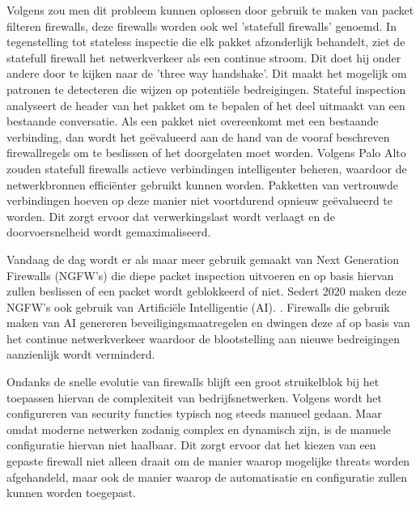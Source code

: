 Volgens \textcite{paloAltoSF2025} zou men dit probleem kunnen oplossen door gebruik te maken van packet filteren firewalls, deze firewalls worden ook wel 'statefull firewalls' genoemd. In tegenstelling tot stateless inspectie die elk pakket afzonderlijk behandelt, ziet de statefull firewall het netwerkverkeer als een continue stroom. Dit doet hij onder andere door te kijken naar de 'three way handshake'. Dit maakt het mogelijk om patronen te detecteren die wijzen op potentiële bedreigingen. Stateful inspection analyseert de header van het pakket om te bepalen of het deel uitmaakt van een bestaande conversatie. Als een pakket niet overeenkomt met een bestaande verbinding, dan wordt het geëvalueerd aan de hand van de vooraf beschreven firewallregels om te beslissen of het doorgelaten moet worden. Volgens Palo Alto zouden statefull firewalls actieve verbindingen intelligenter beheren, waardoor de netwerkbronnen efficiënter gebruikt kunnen worden. Pakketten van vertrouwde verbindingen hoeven op deze manier niet voortdurend opnieuw geëvalueerd te worden. Dit zorgt ervoor dat verwerkingslast wordt verlaagt en de doorvoersnelheid wordt gemaximaliseerd. 

Vandaag de dag wordt er als maar meer gebruik gemaakt van Next Generation Firewalls (NGFW’s) die diepe packet inspection uitvoeren en op basis hiervan zullen beslissen of een packet wordt geblokkeerd of niet. Sedert 2020 maken deze NGFW’s ook gebruik van Artificiële Intelligentie (AI). \autocite{Ahmadi2023}. Firewalls die gebruik maken van AI genereren beveiligingsmaatregelen en dwingen deze af op basis van het continue netwerkverkeer waardoor de blootstelling aan nieuwe bedreigingen aanzienlijk wordt verminderd. \autocite{PaloAltoFW2024}

Ondanks de snelle evolutie van firewalls blijft een groot struikelblok bij het toepassen hiervan de complexiteit van bedrijfsnetwerken. Volgens \textcite{Bringhenti2023} wordt het configureren van security functies typisch nog steeds manueel gedaan. Maar omdat moderne netwerken zodanig complex en dynamisch zijn, is de manuele configuratie hiervan niet haalbaar. Dit zorgt ervoor dat het kiezen van een gepaste firewall niet alleen draait om de manier waarop mogelijke threats worden afgehandeld, maar ook de manier waarop de automatisatie en configuratie zullen kunnen worden toegepast.




